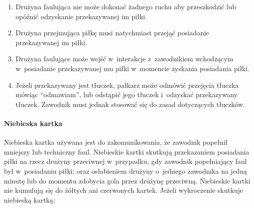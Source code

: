 \documentclass[12pt]{article}
\begin{document}
\begin{enumerate}
	      \begin{enumerate}
		      \item
		            Drużyna faulująca nie może dokonać żadnego ruchu aby przeszkodzić
		            lub opóźnić odzyskanie przekazywanej im piłki.
		      \item
		            Drużyna przejmująca piłkę musi natychmiast przejąć posiadanie
		            przekazywanej im piłki.
		      \item
		            Drużyna faulujące może wejść w~interakcje z~zawodnikiem wchodzącym w~posiadanie przekazywanej mu piłki w~momencie zyskania posiadania
		            piłki.
		      \item
		            Jeżeli przekazywany jest tłuczek, pałkarz może odmówić przejęcia
		            tłuczka mówiąc ``odmawiam'', lub odstąpić jego tłuczek i~odzyskać
		            przekazywany tłuczek. Zawodnik musi jednak stosować się do zasad
		            dotyczących tłuczków.
	      \end{enumerate}
\end{enumerate}

\paragraph{Niebieska kartka}
Niebieska kartka używana jest do
zakomunikowania, że zawodnik popełnił mniejszy lub techniczny faul.
Niebieskie kartki skutkują przekazaniem posiadania piłki na rzecz
drużyny przeciwnej w~przypadku, gdy zawodnik popełniający faul był w~posiadaniu piłki; oraz osłabieniem drużyny o~jednego zawodnika na jedną
minutę lub do momentu zdobycia gola przez drużynę przeciwną. Niebieskie
kartki nie kumulują się do żółtych ani czerwonych kartek. Jeżeli
wykroczenie skutkuje niebieską kartką:
\end{document}
